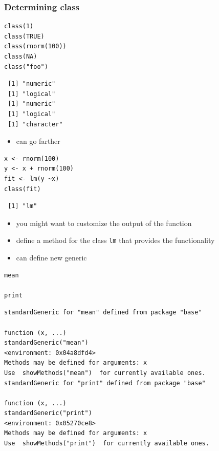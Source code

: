 \documentclass[11pt]{article}
\begin{document}
\subsubsection{Determining class}
\label{sec-4-3-4}



\begin{verbatim}
class(1)
class(TRUE)
class(rnorm(100))
class(NA)
class("foo")
\end{verbatim}

\begin{verbatim}
 [1] "numeric"
 [1] "logical"
 [1] "numeric"
 [1] "logical"
 [1] "character"
\end{verbatim}


\begin{itemize}
\item can go farther
\end{itemize}

\begin{verbatim}
x <- rnorm(100)
y <- x + rnorm(100)
fit <- lm(y ~x)
class(fit)
\end{verbatim}

\begin{verbatim}
 [1] "lm"
\end{verbatim}

\begin{itemize}
\item you might want to customize the output of the function
\item define a method for the class \texttt{lm} that provides the functionality
\item can define new generic
\end{itemize}

\begin{verbatim}
mean

print
\end{verbatim}


\begin{verbatim}
standardGeneric for "mean" defined from package "base"

function (x, ...) 
standardGeneric("mean")
<environment: 0x04a8dfd4>
Methods may be defined for arguments: x
Use  showMethods("mean")  for currently available ones.
standardGeneric for "print" defined from package "base"

function (x, ...) 
standardGeneric("print")
<environment: 0x05270ce8>
Methods may be defined for arguments: x
Use  showMethods("print")  for currently available ones.
\end{verbatim}
\end{document}
